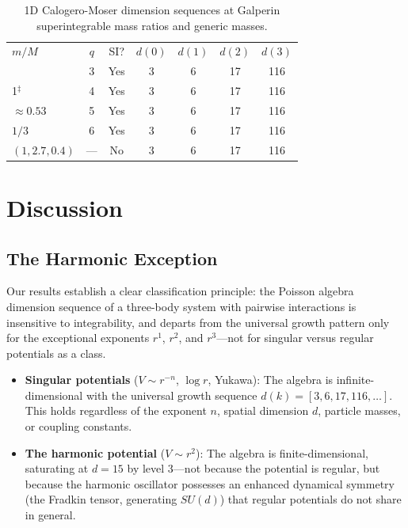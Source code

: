 \documentclass[aps,prl,twocolumn,superscriptaddress,showpacs]{revtex4-2}
\begin{document}
\begin{table}[h]
\caption{1D Calogero-Moser dimension sequences at
Galperin superintegrable mass ratios and generic masses.}
\label{tab:masses}
\begin{ruledtabular}
\begin{tabular}{lcccccc}
$m/M$ & $q$ & SI? & $d(0)$ & $d(1)$ & $d(2)$ & $d(3)$ \\
\colrule
3       & 3 & Yes & 3 & 6 & 17 & 116 \\
1$^\ddagger$  & 4 & Yes & 3 & 6 & 17 & 116 \\
$\approx 0.53$ & 5 & Yes & 3 & 6 & 17 & 116 \\
$1/3$   & 6 & Yes & 3 & 6 & 17 & 116 \\
$(1, 2.7, 0.4)$ & --- & No & 3 & 6 & 17 & 116 \\
\end{tabular}
\end{ruledtabular}
\end{table}


\section{Discussion}
\label{sec:discussion}

\subsection{The Harmonic Exception}

Our results establish a clear classification principle: the Poisson
algebra dimension sequence of a three-body system with pairwise
interactions is insensitive to integrability, and departs from the
universal growth pattern only for the exceptional exponents $r^1$,
$r^2$, and $r^3$---not for singular versus regular potentials as a
class.

\begin{itemize}
\item \textbf{Singular potentials} ($V \sim r^{-n}$, $\log r$,
  Yukawa): The algebra is infinite-dimensional with the universal
  growth sequence $d(k) = [3, 6, 17, 116, \ldots]$.  This holds
  regardless of the exponent $n$, spatial dimension $d$, particle
  masses, or coupling constants.

\item \textbf{The harmonic potential} ($V \sim r^2$): The algebra is
  finite-dimensional, saturating at $d = 15$ by level 3---not because
  the potential is regular, but because the harmonic oscillator
  possesses an enhanced dynamical symmetry (the Fradkin tensor,
  generating $SU(d)$) that regular potentials do not share in
  general.
\end{itemize}
\end{document}
